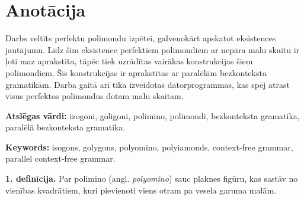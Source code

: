 \documentclass[utf8]{ludis2022}
\begin{document}
\maketitle
\newpage



\section*{Anotācija}

\firstparskip Darbs veltīts perfektu polimondu izpētei, galvenokārt apskatot eksistences jautājumu. Līdz šim eksistence perfektiem polimondiem ar nepāra malu skaitu ir ļoti maz aprakstīta, tāpēc tiek uzrādītas vairākas konstrukcijas šiem polimondiem. Šīs konstrukcijas ir aprakstītas ar paralēlām bezkonteksta gramatikām. Darba gaitā arī tika izveidotas datorprogrammas, kas spēj atrast visus perfektos polimondus dotam malu skaitam. 

\vspace{0.5cm}
\textbf{Atslēgas vārdi:} izogoni, goligoni, polimino, polimondi, bezkonteksta gramatika, paralēlā bezkonteksta gramatika.

\vspace{0.25cm}
\textbf{Keywords:} isogons, golygons, polyomino, polyiamonds, context-free grammar, parallel context-free grammar.

\newpage


\renewcommand{\contentsname}{Satura rādītājs}
\tableofcontents

\newpage
{}

{\bf{1. definīcija.}} Par polimino (angl. {\em polyomino}) sauc plaknes figūru, kas sastāv no vienības kvadrātiem, kuri pievienoti 
viens otram pa vesela garuma malām.

\vspace{10pt}
\end{document}
